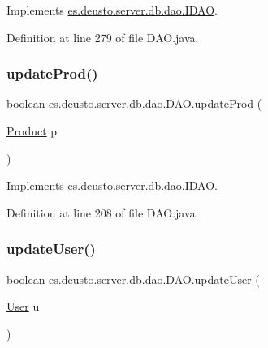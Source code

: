 Implements \hyperlink{interfacees_1_1deusto_1_1server_1_1db_1_1dao_1_1_i_d_a_o_a2a4641aeefc28dc979e0146e8ca73342}{es.\+deusto.\+server.\+db.\+dao.\+I\+D\+AO}.



Definition at line 279 of file D\+A\+O.\+java.

\mbox{\label{classes_1_1deusto_1_1server_1_1db_1_1dao_1_1_d_a_o_a2a7817f0def3d19a7871910ebba76df7}} 
\subsubsection{\texorpdfstring{update\+Prod()}{updateProd()}}
{\footnotesize\ttfamily boolean es.\+deusto.\+server.\+db.\+dao.\+D\+A\+O.\+update\+Prod (\begin{DoxyParamCaption}\item[{\hyperlink{classes_1_1deusto_1_1server_1_1db_1_1data_1_1_product}{Product}}]{p }\end{DoxyParamCaption})}



Implements \hyperlink{interfacees_1_1deusto_1_1server_1_1db_1_1dao_1_1_i_d_a_o_afc4634e403796a1b66fc5251b5b86d1e}{es.\+deusto.\+server.\+db.\+dao.\+I\+D\+AO}.



Definition at line 208 of file D\+A\+O.\+java.

\mbox{\label{classes_1_1deusto_1_1server_1_1db_1_1dao_1_1_d_a_o_a7f6ed77294fe1f61cbebbea410cef6e0}} 
\subsubsection{\texorpdfstring{update\+User()}{updateUser()}}
{\footnotesize\ttfamily boolean es.\+deusto.\+server.\+db.\+dao.\+D\+A\+O.\+update\+User (\begin{DoxyParamCaption}\item[{\hyperlink{classes_1_1deusto_1_1server_1_1db_1_1data_1_1_user}{User}}]{u }\end{DoxyParamCaption})}



